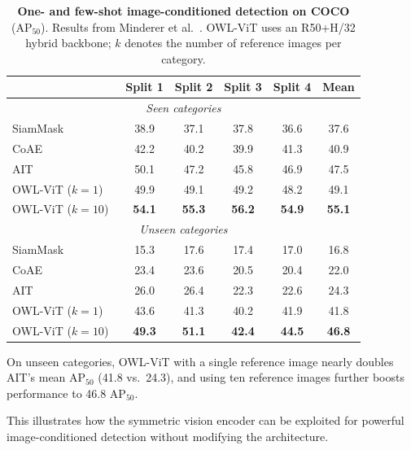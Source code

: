 \begin{enrichment}
\begin{enrichment}
		\begin{table}[H]
			\centering
			\small
			\caption{\textbf{One- and few-shot image-conditioned detection on COCO} (AP$_{50}$). Results from Minderer et al.~\cite{minderer2022_owlvit}. OWL-ViT uses an R50+H/32 hybrid backbone; $k$ denotes the number of reference images per category.}
			\label{tab:chapter14_owlvit_coco_image_conditioned}
			\begin{tabular}{l c c c c c}
				\toprule
				& Split 1 & Split 2 & Split 3 & Split 4 & Mean \\
				\midrule
				\multicolumn{6}{c}{\textit{Seen categories}} \\
				\midrule
				SiamMask~\cite{hu2022_siammask} & 38.9 & 37.1 & 37.8 & 36.6 & 37.6 \\
				CoAE~\cite{hsieh2019_oneshot}   & 42.2 & 40.2 & 39.9 & 41.3 & 40.9 \\
				AIT~\cite{chen2021_ait}        & 50.1 & 47.2 & 45.8 & 46.9 & 47.5 \\
				OWL-ViT ($k=1$)~\cite{minderer2022_owlvit} & 49.9 & 49.1 & 49.2 & 48.2 & 49.1 \\
				OWL-ViT ($k=10$)~\cite{minderer2022_owlvit} & \textbf{54.1} & \textbf{55.3} & \textbf{56.2} & \textbf{54.9} & \textbf{55.1} \\
				\midrule
				\multicolumn{6}{c}{\textit{Unseen categories}} \\
				\midrule
				SiamMask~\cite{hu2022_siammask} & 15.3 & 17.6 & 17.4 & 17.0 & 16.8 \\
				CoAE~\cite{hsieh2019_oneshot}   & 23.4 & 23.6 & 20.5 & 20.4 & 22.0 \\
				AIT~\cite{chen2021_ait}        & 26.0 & 26.4 & 22.3 & 22.6 & 24.3 \\
				OWL-ViT ($k=1$)~\cite{minderer2022_owlvit} & 43.6 & 41.3 & 40.2 & 41.9 & 41.8 \\
				OWL-ViT ($k=10$)~\cite{minderer2022_owlvit} & \textbf{49.3} & \textbf{51.1} & \textbf{42.4} & \textbf{44.5} & \textbf{46.8} \\
				\bottomrule
			\end{tabular}
		\end{table}
		
		On unseen categories, OWL-ViT with a single reference image nearly doubles AIT’s mean AP$_{50}$ (41.8 vs.\ 24.3), and using ten reference images further boosts performance to 46.8 AP$_{50}$.
		
		\newpage
		
		This illustrates how the symmetric vision encoder can be exploited for powerful image-conditioned detection without modifying the architecture.
		

\end{enrichment}
\end{enrichment}
